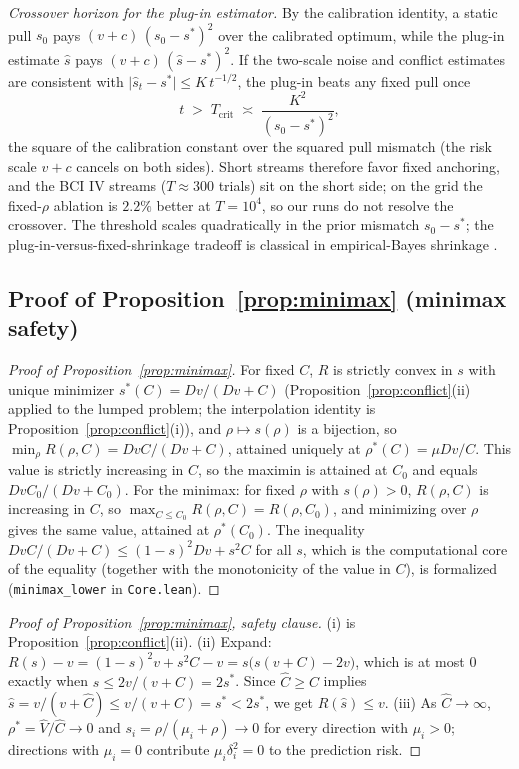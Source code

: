 \medskip
\noindent\emph{Crossover horizon for the plug-in estimator.}
By the calibration identity, a static pull $s_0$ pays $(v + c)\,(s_0 - s^*)^2$ over the calibrated optimum, while the plug-in estimate $\hat s$ pays $(v + c)\,(\hat s - s^*)^2$.
If the two-scale noise and conflict estimates are consistent with $\lvert\hat s_t - s^*\rvert \le K\,t^{-1/2}$, the plug-in beats any fixed pull once
\[
  t \;>\; T_{\mathrm{crit}} \;\asymp\; \frac{K^2}{(s_0 - s^*)^2},
\]
the square of the calibration constant over the squared pull mismatch (the risk scale $v+c$ cancels on both sides).
Short streams therefore favor fixed anchoring, and the BCI IV streams ($T \approx 300$ trials) sit on the short side; on the grid the fixed-$\rho$ ablation is $2.2\%$ better at $T = 10^4$, so our runs do not resolve the crossover. The threshold scales quadratically in the prior mismatch $s_0 - s^*$; the plug-in-versus-fixed-shrinkage tradeoff is classical in empirical-Bayes shrinkage \citep{ledoitwolf2004}.

\subsection{Proof of Proposition~\ref{prop:minimax} (minimax safety)}
\label{app:proof-minimax}



\begin{proof}[Proof of Proposition~\ref{prop:minimax}]
For fixed $C$, $R$ is strictly convex in $s$ with unique minimizer $s^*(C) = Dv/(Dv + C)$ (Proposition~\ref{prop:conflict}(ii) applied to the lumped problem; the interpolation identity is Proposition~\ref{prop:conflict}(i)), and $\rho \mapsto s(\rho)$ is a bijection, so $\min_\rho R(\rho, C) = DvC/(Dv + C)$, attained uniquely at $\rho^*(C) = \mu Dv/C$.
This value is strictly increasing in $C$, so the maximin is attained at $C_0$ and equals $DvC_0/(Dv + C_0)$.
For the minimax: for fixed $\rho$ with $s(\rho) > 0$, $R(\rho, C)$ is increasing in $C$, so $\max_{C \le C_0} R(\rho, C) = R(\rho, C_0)$, and minimizing over $\rho$ gives the same value, attained at $\rho^*(C_0)$.
The inequality $DvC/(Dv + C) \le (1 - s)^2 Dv + s^2 C$ for all $s$, which is the computational core of the equality (together with the monotonicity of the value in $C$), is formalized (\texttt{minimax\_lower} in \texttt{Core.lean}).
\end{proof}



\begin{proof}[Proof of Proposition~\ref{prop:minimax}, safety clause]
(i) is Proposition~\ref{prop:conflict}(ii).
(ii) Expand: $R(s) - v = (1-s)^2 v + s^2 C - v = s\bigl(s(v + C) - 2v\bigr)$, which is at most $0$ exactly when $s \le 2v/(v+C) = 2s^*$.
Since $\widehat C \ge C$ implies $\widehat s = v/(v + \widehat C) \le v/(v + C) = s^* < 2s^*$, we get $R(\widehat s) \le v$.
(iii) As $\widehat C \to \infty$, $\rho^* = \widehat V/\widehat C \to 0$ and $s_i = \rho/(\mu_i + \rho) \to 0$ for every direction with $\mu_i > 0$; directions with $\mu_i = 0$ contribute $\mu_i \delta_i^2 = 0$ to the prediction risk.
\end{proof}

